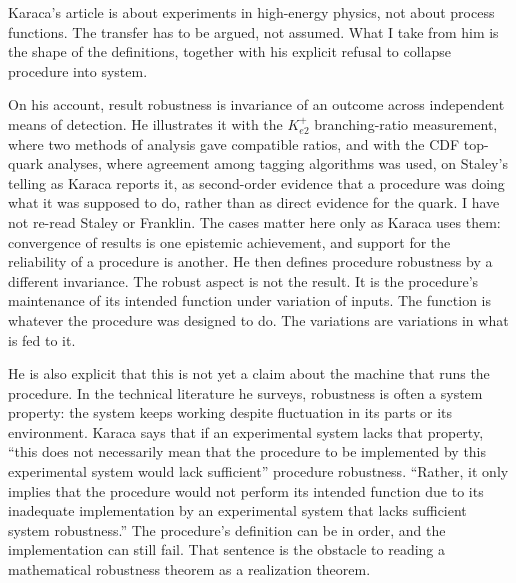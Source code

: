 \documentclass[12pt]{article}
\begin{document}
Karaca's article is about experiments in high-energy physics, not about process functions. The transfer has to be argued, not assumed. What I take from him is the shape of the definitions, together with his explicit refusal to collapse procedure into system.

On his account, result robustness is invariance of an outcome across independent means of detection. He illustrates it with the \(K^{+}_{e2}\) branching-ratio measurement, where two methods of analysis gave compatible ratios, and with the CDF top-quark analyses, where agreement among tagging algorithms was used, on Staley's telling as Karaca reports it, as second-order evidence that a procedure was doing what it was supposed to do, rather than as direct evidence for the quark. I have not re-read Staley or Franklin. The cases matter here only as Karaca uses them: convergence of results is one epistemic achievement, and support for the reliability of a procedure is another. He then defines procedure robustness by a different invariance. The robust aspect is not the result. It is the procedure's maintenance of its intended function under variation of inputs. The function is whatever the procedure was designed to do. The variations are variations in what is fed to it.

He is also explicit that this is not yet a claim about the machine that runs the procedure. In the technical literature he surveys, robustness is often a system property: the system keeps working despite fluctuation in its parts or its environment. Karaca says that if an experimental system lacks that property, ``this does not necessarily mean that the procedure to be implemented by this experimental system would lack sufficient'' procedure robustness. ``Rather, it only implies that the procedure would not perform its intended function due to its inadequate implementation by an experimental system that lacks sufficient system robustness.'' The procedure's definition can be in order, and the implementation can still fail. That sentence is the obstacle to reading a mathematical robustness theorem as a realization theorem.
\end{document}
